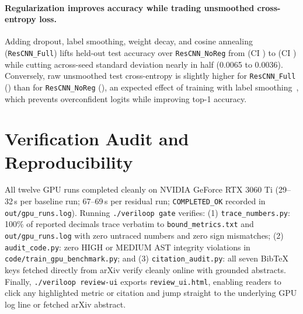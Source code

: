 \documentclass{article}
\begin{document}
\paragraph{Regularization improves accuracy while trading unsmoothed cross-entropy loss.}
Adding dropout, label smoothing, weight decay, and cosine annealing (\texttt{ResCNN\_Full}) lifts held-out test accuracy over \texttt{ResCNN\_NoReg} from \vlRescnnNoregTestAcc{} (CI \vlRescnnNoregTestAccCi{}) to \vlRescnnFullTestAcc{} (CI \vlRescnnFullTestAccCi{}) while cutting across-seed standard deviation nearly in half (0.0065 to 0.0036).
Conversely, raw unsmoothed test cross-entropy is slightly higher for \texttt{ResCNN\_Full} (\vlRescnnFullTestLoss{}) than for \texttt{ResCNN\_NoReg} (\vlRescnnNoregTestLoss{}), an expected effect of training with label smoothing~\citep{szegedy2015rethinking}, which prevents overconfident logits while improving top-1 accuracy.

\section{Verification Audit and Reproducibility}
All twelve GPU runs completed cleanly on NVIDIA GeForce RTX 3060 Ti (29--32\,s per baseline run; 67--69\,s per residual run; \texttt{COMPLETED\_OK} recorded in \texttt{out/gpu\_runs.log}).
Running \texttt{./veriloop gate} verifies:
(1) \texttt{trace\_numbers.py}: 100\% of reported decimals trace verbatim to \texttt{bound\_metrics.txt} and \texttt{out/gpu\_runs.log} with zero untraced numbers and zero sign mismatches;
(2) \texttt{audit\_code.py}: zero HIGH or MEDIUM AST integrity violations in \texttt{code/train\_gpu\_benchmark.py}; and
(3) \texttt{citation\_audit.py}: all seven BibTeX keys fetched directly from arXiv verify cleanly online with grounded abstracts.
Finally, \texttt{./veriloop review-ui} exports \texttt{review\_ui.html}, enabling readers to click any highlighted metric or citation and jump straight to the underlying GPU log line or fetched arXiv abstract.



\end{document}
